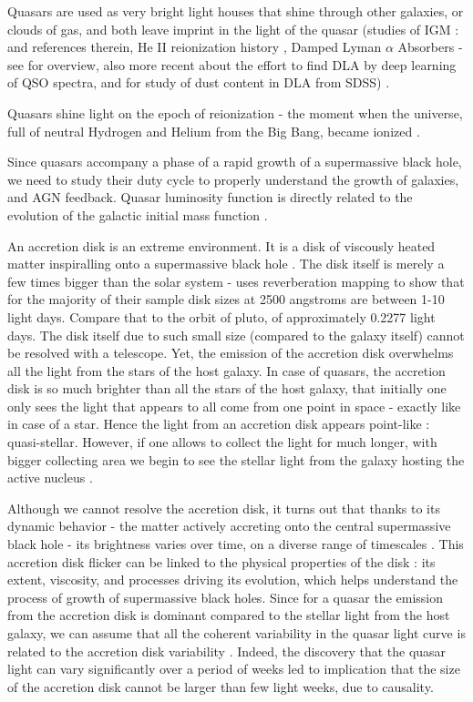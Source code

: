 \documentclass[modern]{aastex62}
\begin{document}
Quasars are used as very bright light houses that shine through other galaxies, or clouds of gas, and both leave imprint in the light of the quasar  (studies of IGM : \cite{prochaska2014} and references therein,  He II reionization history \cite{khrykin2017} , Damped Lyman $\alpha$ Absorbers - see \cite{wolfe2005} for overview, also more recent \cite{parks2018} about the effort to find DLA by deep learning of QSO spectra, and \cite{murphy2016} for study of  dust content in DLA from SDSS) .  

Quasars shine light on the epoch of reionization - the moment when the universe, full of neutral Hydrogen and Helium from the Big Bang, became ionized \citep{alsayyad2016}.


Since quasars accompany a phase of a rapid growth of a supermassive black hole, we need to study their duty cycle to properly understand the growth of galaxies, and AGN feedback. Quasar luminosity function is directly related to the evolution of the galactic initial mass function \citep{mcgreer2013}. 

An accretion disk is an extreme environment. It is a disk of viscously heated matter inspiralling onto a supermassive black hole \citep{ruan2017}. The disk itself is merely a few times bigger than  the solar system -  \citep{mudd2017} uses reverberation mapping to show that for the majority of their sample disk sizes at 2500 angstroms are between 1-10 light days. Compare that to the orbit of pluto, of approximately 0.2277 light days. The disk itself due to such small size (compared to the galaxy itself) cannot be resolved with a telescope.  Yet, the emission of the accretion disk overwhelms all the light from the stars of the host galaxy.   In case of quasars, the accretion disk is so much brighter than all the stars of the host galaxy, that initially one only sees the light that appears to all come from one point in space - exactly like in case of a star. Hence the light from an accretion disk appears point-like : quasi-stellar. However,  if one allows to collect the light for much longer, with bigger collecting area  we begin to see the stellar light from the galaxy hosting the active nucleus \citep{hutchings2002,kotilainen2013, falomo2014, liuzzo2016, bayliss2017}. 

Although we cannot resolve the accretion disk, it turns out that thanks to its dynamic behavior  - the matter actively accreting onto the central supermassive black hole - its brightness varies over time, on a diverse range of timescales \citep{schawinski2015}. This accretion disk flicker can be linked to the physical properties of the disk : its extent, viscosity, and processes driving its evolution, which helps understand the process of growth of supermassive black holes.  Since for a quasar the emission from the accretion disk is dominant compared to the stellar light from the host galaxy, we can assume that all the coherent variability  in the quasar light curve is related to the accretion disk variability . Indeed, the discovery that the quasar light can vary significantly over a period of weeks led to implication that the size of the accretion disk cannot be larger than few light weeks, due to causality. 
\end{document}
